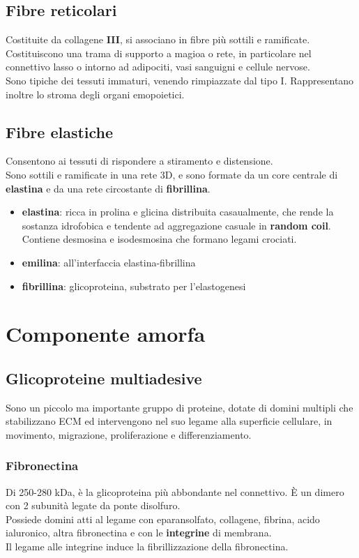 \documentclass[a4paper, 12pt]{article}
\begin{document}
\subsection{Fibre reticolari}
Costituite da collagene \textbf{III}, si associano in fibre più sottili e ramificate.\\
Costituiscono una trama di supporto a magioa o rete, in particolare nel connettivo lasso o intorno ad adipociti, vasi sanguigni e cellule nervose.\\
Sono tipiche dei tessuti immaturi, venendo rimpiazzate dal tipo I. Rappresentano inoltre lo stroma degli organi emopoietici.

\subsection{Fibre elastiche}
Consentono ai tessuti di rispondere a stiramento e distensione.\\
Sono sottili e ramificate in una rete 3D, e sono formate da un core centrale di \textbf{elastina} e da una rete circostante di \textbf{fibrillina}.
\begin{itemize}
  \item \textbf{elastina}: ricca in prolina e glicina distribuita casaualmente, che rende la sostanza idrofobica e tendente ad aggregazione casuale in \textbf{random coil}. Contiene desmosina e isodesmosina che formano legami crociati.
  \item \textbf{emilina}: all'interfaccia elastina-fibrillina
  \item \textbf{fibrillina}: glicoproteina, substrato per l'elastogenesi
\end{itemize}

\section{Componente amorfa}

\subsection{Glicoproteine multiadesive}
Sono un piccolo ma importante gruppo di proteine, dotate di domini multipli che stabilizzano ECM ed intervengono nel suo legame alla superficie cellulare, in movimento, migrazione, proliferazione e differenziamento.

\subsubsection{Fibronectina}
Di 250-280 kDa, è la glicoproteina più abbondante nel connettivo. È un dimero con 2 subunità legate da ponte disolfuro.\\
Possiede domini atti al legame con eparansolfato, collagene, fibrina, acido ialuronico, altra fibronectina e con le \textbf{integrine} di membrana.\\ Il legame alle integrine induce la fibrillizzazione della fibronectina.
\end{document}
